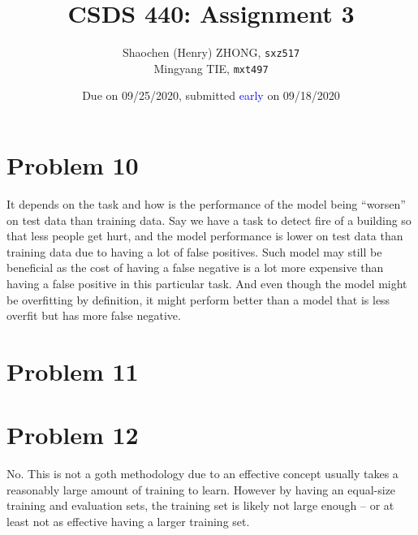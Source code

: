 \documentclass[12pt]{article}
\newcommand{\ilcode}{\texttt}
\begin{document}
\title{\textbf{CSDS 440: Assignment 3}}

\author{Shaochen (Henry) ZHONG, \ilcode{sxz517} \\ Mingyang TIE, \ilcode{mxt497}}
\date{Due on 09/25/2020, submitted \textcolor{blue}{early} on 09/18/2020}
\maketitle


\section{Problem 10}

It depends on the task and how is the performance of the model being ``worsen'' on test data than training data. Say we have a task to detect fire of a building so that less people get hurt, and the model performance is lower on test data than training data due to having a lot of false positives. Such model may still be beneficial as the cost of having a false negative is a lot more expensive than having a false positive in this particular task. And even though the model might be overfitting by definition, it might perform better than a model that is less overfit but has more false negative.

\section{Problem 11}


\section{Problem 12}

No. This is not a goth methodology due to an effective concept usually takes a reasonably large amount of training to learn. However by having an equal-size training and evaluation sets, the training set is likely not large enough -- or at least not as effective having a larger training set.
\end{document}
